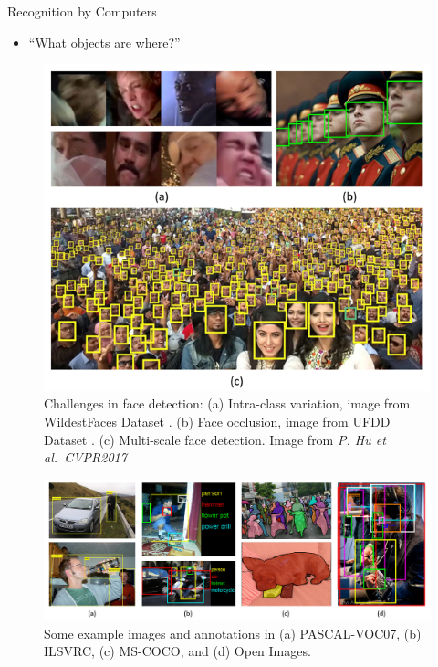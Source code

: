 \documentclass{beamer}
\begin{document}
\begin{frame}{Recognition by Computers}
    \begin{itemize}[<+-| alert@+>] %
        \item %
       \centering “What objects are where?”
    \end{itemize}
    
    \begin{figure}[h!]
        \begin{center}
            \includegraphics[width=0.55\linewidth]{face-challenge.png}
            \caption{Challenges in face detection: (a) Intra-class variation, image from WildestFaces Dataset . (b) Face occlusion, image from UFDD Dataset .  (c) Multi-scale face detection. Image from \textit{P. Hu et al.\ CVPR2017}
            }
        \end{center}
    \end{figure}    
    
    \begin{figure}[h!]
        \begin{center}
            \includegraphics[width=1\linewidth]{dataset-examples.png}
            \caption{Some example images and annotations in (a) PASCAL-VOC07, (b) ILSVRC, (c) MS-COCO, and (d) Open Images.}
        \end{center}
    \end{figure}
    
\end{frame}
\end{document}
